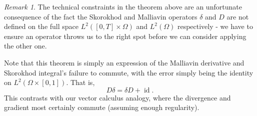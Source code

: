 \documentclass[11pt, a4paper, twoside]{book}
\theoremstyle{plain}
\theoremstyle{definition}
\theoremstyle{remark}
\newtheorem{remark}[theorem]{Remark}
\DeclareMathOperator\id{id}
\begin{document}
\begin{remark}
	The technical constraints in the theorem above are an unfortunate
	consequence of the fact the Skorokhod and Malliavin operators $\delta$ and
	$D$ are not defined on the full space $L^2([0,T]\times\Omega)$ and
	$L^2(\Omega)$ respectively - we have to ensure an operator throws us to the
	right spot before we can consider applying the other one.

	Note that this theorem is simply an expression of the Malliavin derivative
	and Skorokhod integral's failure to commute, with the error simply being
	the identity on $L^2(\Omega \times [0, 1])$. That is,
	\[
		D\delta = \delta D + \id.
	\]
	This contrasts with our vector
	calculus analogy, where the divergence and gradient most certainly commute
	(assuming enough regularity).
\end{remark}
\end{document}

